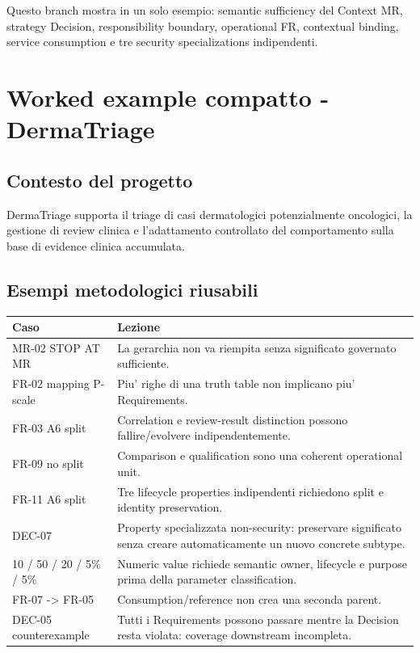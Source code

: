 \documentclass[11pt,a4paper]{article}
\begin{document}
Questo branch mostra in un solo esempio: semantic sufficiency del Context MR, strategy Decision, responsibility boundary, operational FR, contextual binding, service consumption e tre security specializations indipendenti.

\section{Worked example compatto - DermaTriage}

\subsection{Contesto del progetto}

DermaTriage supporta il triage di casi dermatologici potenzialmente oncologici, la gestione di review clinica e l'adattamento controllato del comportamento sulla base di evidence clinica accumulata.

\subsection{Esempi metodologici riusabili}

\begin{tabularx}{\textwidth}{L{48mm}Y}
\toprule
\textbf{Caso} & \textbf{Lezione} \\
\midrule
MR-02 STOP AT MR & La gerarchia non va riempita senza significato governato sufficiente. \\
FR-02 mapping P-scale & Piu' righe di una truth table non implicano piu' Requirements. \\
FR-03 A6 split & Correlation e review-result distinction possono fallire/evolvere indipendentemente. \\
FR-09 no split & Comparison e qualification sono una coherent operational unit. \\
FR-11 A6 split & Tre lifecycle properties indipendenti richiedono split e identity preservation. \\
DEC-07 & Property specializzata non-security: preservare significato senza creare automaticamente un nuovo concrete subtype. \\
10 / 50 / 20 / 5\% / 5\% & Numeric value richiede semantic owner, lifecycle e purpose prima della parameter classification. \\
FR-07 -> FR-05 & Consumption/reference non crea una seconda parent. \\
DEC-05 counterexample & Tutti i Requirements possono passare mentre la Decision resta violata: coverage downstream incompleta. \\
\bottomrule
\end{tabularx}
\end{document}

